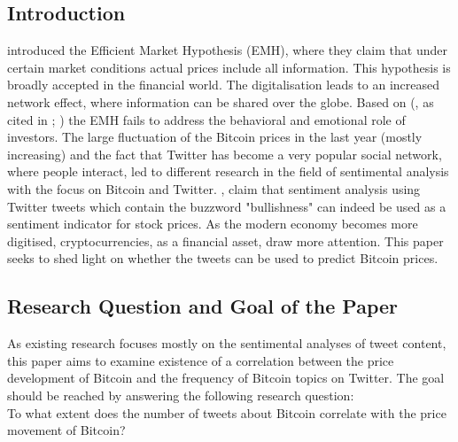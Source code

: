 \documentclass[a4paper,american,12pt]{article}
\begin{document}
\begin{spacing}{1.2}
\cleardoublepage{}
\section{Introduction}
\label{sec:intro}

\textcite[p.~388]{malkiel1970efficient} introduced the Efficient Market Hypothesis (EMH), where they claim that under certain market conditions actual prices include all information. This hypothesis is broadly accepted in the financial world. The digitalisation leads to an increased network effect, where information can be shared over the globe. Based on \citeauthor{mao2015quantifying} (\citeyear[][p.~3]{mao2015quantifying}, as cited in \cite[][pp.~175--195]{shiller2015irrational}; \cite[][pp.~279]{kahneman2013prospect}) the EMH fails to address the behavioral and emotional role of investors. The large fluctuation of the Bitcoin prices in the last year (mostly increasing) and the fact that Twitter has become a very popular social network, where people interact, led to different research in the field of sentimental analysis with the focus on Bitcoin and Twitter. \textcite[p.~18]{mao2015quantifying}, claim that sentiment analysis using Twitter tweets which contain the buzzword "bullishness" can indeed be used as a sentiment indicator for stock prices. As the modern economy becomes more digitised, cryptocurrencies, as a financial asset, draw more attention. This paper seeks to shed light on whether the tweets can be used to predict Bitcoin prices.

\subsection{Research Question and Goal of the Paper}
\label{sec:ResearchQandGoal}

As existing research focuses mostly on the sentimental analyses of tweet content, this paper aims to examine existence of a correlation between the price development of Bitcoin and the frequency of Bitcoin topics on Twitter. The goal should be reached by answering the following research question: \\
To what extent does the number of tweets about Bitcoin correlate with the price movement of Bitcoin?



\end{spacing}
\end{document}
